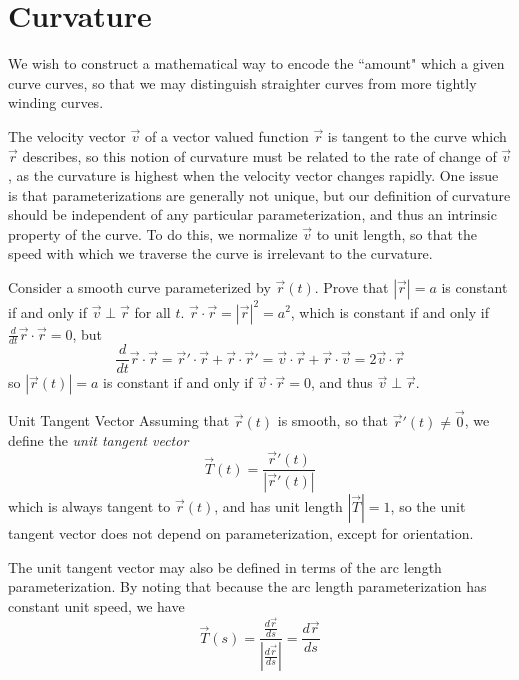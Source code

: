\documentclass[../main.tex]{subfiles}
\begin{document}
        \section{Curvature}
        We wish to construct a mathematical way to encode the ``amount" which a given curve curves, so that we may distinguish straighter curves from more tightly winding curves.

        The velocity vector \(\vec{v}\) of a vector valued function \(\vec{r}\) is tangent to the curve which \(\vec{r}\) describes, so this notion of curvature must be related to the rate of change of \(\vec{v}\), as the curvature is highest when the velocity vector changes rapidly. One issue is that parameterizations are generally not unique, but our definition of curvature should be independent of any particular parameterization, and thus an intrinsic property of the curve. To do this, we normalize \(\vec{v}\) to unit length, so that the speed with which we traverse the curve is irrelevant to the curvature.
        \begin{theorem}{}{}
                Consider a smooth curve parameterized by \(\vec{r}(t)\). Prove that \(|\vec{r}|=a\) is constant if and only if \(\vec{v}\perp\vec{r}\) for all \(t\).
                \tcblower
                \(\vec{r}\cdot\vec{r}=|\vec{r}|^2=a^2\), which is constant if and only if \(\frac{d}{dt}\vec{r}\cdot\vec{r}=0\), but
                \[
                \frac{d}{dt}\vec{r}\cdot\vec{r}=\vec{r}'\cdot\vec{r}+\vec{r}\cdot\vec{r}'=\vec{v}\cdot\vec{r}+\vec{r}\cdot\vec{v}=2\vec{v}\cdot\vec{r}
                \]
                so \(|\vec{r}(t)|=a\) is constant if and only if \(\vec{v}\cdot\vec{r}=0\), and thus \(\vec{v}\perp\vec{r}\).
        \end{theorem}
        \begin{definition}{Unit Tangent Vector}{}
                Assuming that \(\vec{r}(t)\) is smooth, so that \(\vec{r}'(t)\neq\vec{0}\), we define the \emph{unit tangent vector}
                \[
                \vec{T}(t)=\frac{\vec{r}'(t)}{|\vec{r}'(t)|}
                \]
                which is always tangent to \(\vec{r}(t)\), and has unit length \(|\vec{T}|=1\), so the unit tangent vector does not depend on parameterization, except for orientation.

                The unit tangent vector may also be defined in terms of the arc length parameterization. By noting that because the arc length parameterization has constant unit speed, we have
                \[
                \vec{T}(s)=\frac{\frac{d\vec{r}}{ds}}{\left|\frac{d\vec{r}}{ds}\right|}=\frac{d\vec{r}}{ds}
                \]
        \end{definition}
\end{document}

